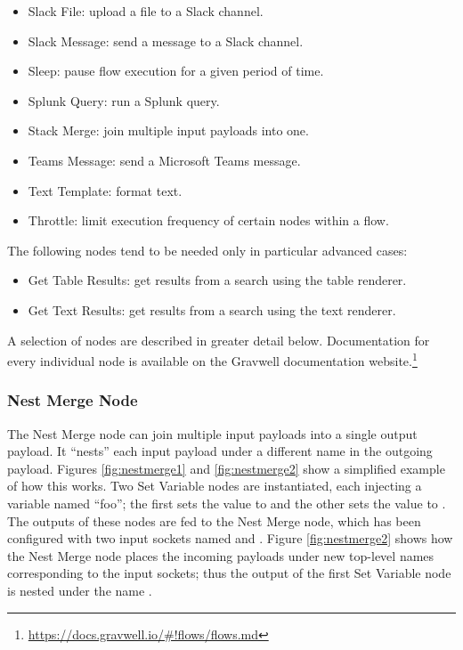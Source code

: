 \begin{itemize}
\item Slack File: upload a file to a Slack channel.
\item Slack Message: send a message to a Slack channel.
\item Sleep: pause flow execution for a given period of time.
\item Splunk Query: run a Splunk query.
\item Stack Merge: join multiple input payloads into one.
\item Teams Message: send a Microsoft Teams message.
\item Text Template: format text.
\item Throttle: limit execution frequency of certain nodes within a flow.
\end{itemize}

The following nodes tend to be needed only in particular advanced cases:

\begin{itemize}
\item Get Table Results: get results from a search using the table renderer.
\item Get Text Results: get results from a search using the text renderer.
\end{itemize}

A selection of nodes are described in greater detail below. Documentation for every individual node is available on the Gravwell documentation website.\footnote{\href{https://docs.gravwell.io/\#!flows/flows.md}{https://docs.gravwell.io/\#!flows/flows.md}}

\subsubsection{Nest Merge Node}
The Nest Merge node can join multiple input payloads into a single output payload. It ``nests'' each input payload under a different name in the outgoing payload. Figures \ref{fig:nestmerge1} and \ref{fig:nestmerge2} show a simplified example of how this works. Two Set Variable nodes are instantiated, each injecting a variable named ``foo''; the first sets the value to  and the other sets the value to . The outputs of these nodes are fed to the Nest Merge node, which has been configured with two input sockets named  and . Figure \ref{fig:nestmerge2} shows how the Nest Merge node places the incoming payloads under new top-level names corresponding to the input sockets; thus the  output of the first Set Variable node is nested under the name .

